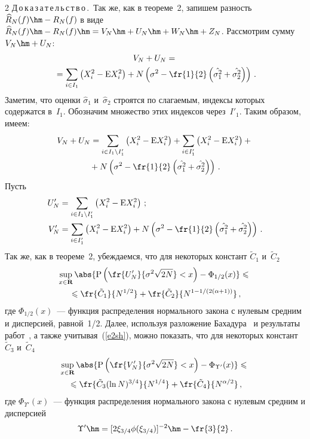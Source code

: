 \begin{multicols}{2}
\noindent
Д\,о\,к\,а\,з\,а\,т\,е\,л\,ь\,с\,т\,в\,о\,.\ 
Так же, как в теореме~2, запишем разность $\widehat{R}_N(f)\hm-R_N(f)$ в виде
$\widehat{R}_N(f)\hm-R_N(f)\hm=V_N\hm+U_N\hm+W_N\hm+Z_N$. Рассмотрим сумму $V_N\hm+U_N$:
\begin{multline*}
V_N+U_N={}\\
{}=\sum\limits_{i\in I_1}\left(X_i^2-\mbox{E}X_i^2\right)+
N\left(\sigma^2-\fr{1}{2}\left(\hat{\sigma_1^2}+\hat{\sigma_2^2}\right)\right)\,.
\end{multline*}
Заметим, что оценки $\hat{\sigma}_1$ и~$\hat{\sigma}_2$ строятся по сла\-га\-емым, 
индексы которых содержатся в~$I_1$. Обозначим множество этих индексов через~$I'_1$. 
Таким образом, имеем:
\begin{multline*}
V_N+U_N=\sum\limits_{i\in I_1\setminus I'_1}\left(
X_i^2-\mbox{E}X_i^2\right)+\sum\limits_{i\in I'_1}\left(
X_i^2-\mbox{E}X_i^2\right)+{}\\
{}+N\left(\sigma^2-\fr{1}{2}\left(
\hat{\sigma_1^2}+\hat{\sigma_2^2}\right)\right)\,.
\end{multline*}
Пусть
\begin{align*}
U'_N&=\sum\limits_{i\in I_1\setminus I'_1}\left(X_i^2-\mbox{E}X_i^2\right)\,;
\\
V'_N&=\sum\limits_{i\in I'_1}\left(X_i^2-\mbox{E}X_i^2\right)+
N\left(\sigma^2-\fr{1}{2}\left(\hat{\sigma_1^2}+\hat{\sigma_2^2}\right)\right)\,.
\end{align*}
Так же, как в теореме~2, убеждаемся, что для некоторых констант  $\tilde{C}_1$ и~$\tilde{C}_2$
\begin{multline}
\sup\limits_{x\in\mathbf{R}}\abs{\mbox{P}\left(
\fr{U'_N}{\sigma^2\sqrt{2N}}<x\right)-\Phi_{1/2}(x)}\leqslant{}\\
{}\leqslant
\fr{\tilde{C}_1}{N^{{1}/{2}}}+\fr{\tilde{C}_2}{N^{1-{1}/(2(\alpha+1))}}\,,\label{e28sh}
\end{multline}
где $\Phi_{1/2}(x)$~--- функция распределения нормального закона с нулевым 
средним и дисперсией, равной~1/2.
Далее, используя разложение Бахадура~\cite{14sh} и результаты 
работ~\cite{7sh, 12sh, 17sh, 16sh, 20sh}, 
а также учитывая~(\ref{e2sh}), можно показать, что для некоторых констант~$\tilde{C}_3$ 
и~$\tilde{C}_4$
\begin{multline}
\sup\limits_{x\in\mathbf{R}}\abs{\mbox{P}\left(
\fr{V'_N}{\sigma^2\sqrt{2N}}<x\right)-\Phi_{\Upsilon'}(x)}\leqslant{}\\
{}\leqslant
\fr{\tilde{C}_3(\ln N)^{{3}/{4}}}{N^{{1}/{4}}}+
\fr{\tilde{C}_4}{N^{{\alpha}/{2}}}\,,\label{e29sh}
\end{multline}
где $\Phi_{\Upsilon'}(x)$~--- функция распределения нормального закона с нулевым 
средним и дисперсией 
$$
\Upsilon'\hm=[2\xi_{3/4}\phi(\xi_{3/4})]^{-2}\hm-\fr{3}{2}\,.
$$


\end{multicols}
